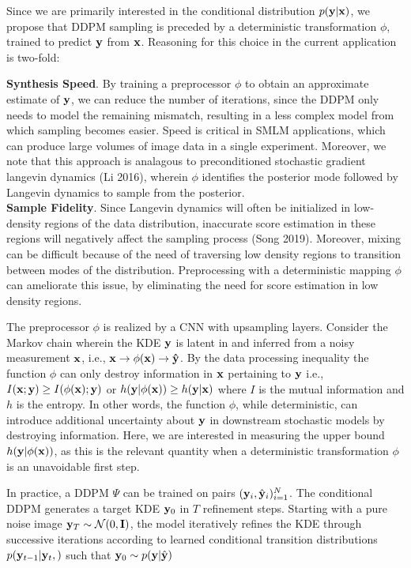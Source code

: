 \documentclass{article}
\begin{document}
Since we are primarily interested in the conditional distribution $p(\bold{y}|\bold{x})$, we propose that DDPM sampling is preceded by a deterministic transformation $\phi$, trained to predict $\bold{y}$ from $\bold{x}$. Reasoning for this choice in the current application is two-fold:

\textbf{Synthesis Speed}. By training a preprocessor $\phi$ to obtain an approximate estimate of $\bold{y}$, we can reduce the number of iterations, since the DDPM only needs to model the remaining mismatch, resulting in a less complex model from which sampling becomes easier. Speed is critical in SMLM applications, which can produce large volumes of image data in a single experiment. Moreover, we note that this approach is analagous to preconditioned stochastic gradient langevin dynamics (Li 2016), wherein $\phi$ identifies the posterior mode followed by Langevin dynamics to sample from the posterior. \\

\textbf{Sample Fidelity}. Since Langevin dynamics will often be initialized in low-density regions of the data distribution, inaccurate score estimation in these regions will negatively affect the sampling
process (Song 2019). Moreover, mixing can be difficult because of the need of traversing low density regions to transition between modes of the distribution. Preprocessing with a deterministic mapping $\phi$ can ameliorate this issue, by eliminating the need for score estimation in low density regions. 

The preprocessor $\phi$ is realized by a CNN with upsampling layers. Consider the Markov chain wherein the KDE $\bold{y}$ is latent in and inferred from a noisy measurement $\bold{x}$, i.e., $\bold{x} \rightarrow \phi(\bold{x})\rightarrow \bold{\hat{y}}$. By the data processing inequality the function $\phi$ can only destroy information in $\bold{x}$ pertaining to $\bold{y}$ i.e., $I(\bold{x};\bold{y}) \geq I(\phi(\bold{x});\bold{y})$ or $h(\bold{y}|\phi(\bold{x})) \geq h(\bold{y}|\bold{x})$ where $I$ is the mutual information and $h$ is the entropy. In other words, the function $\phi$, while deterministic, can introduce additional uncertainty about $\bold{y}$ in downstream stochastic models by destroying information. Here, we are interested in measuring the upper bound $h(\bold{y}|\phi(\bold{x}))$, as this is the relevant quantity when a deterministic transformation $\phi$ is an unavoidable first step. 

In practice, a DDPM $\Psi$ can be trained on pairs $(\bold{y}_i,\hat{\bold{y}}_{i})_{i=1}^{N}$. The conditional DDPM generates a target KDE $\bold{y}_0$ in $T$ refinement steps. Starting with a pure noise image $\bold{y}_{T}\sim \mathcal{N}(0,\bold{I})$, the model iteratively refines the KDE through successive iterations according to learned conditional transition distributions $p(\bold{y}_{t-1}|\bold{y}_{t},\bold{})$ such that $\bold{y}_{0} \sim p(\bold{y}|\hat{\bold{y}})$ 
\end{document}
